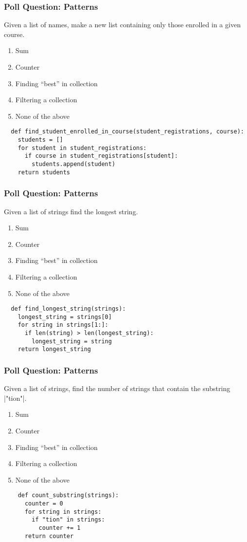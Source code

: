 \documentclass{beamer}
\begin{document}
%
%
\begin{frame}[fragile]
  \frametitle{Poll Question: Patterns}
  Given a list of names, make a new list containing only those enrolled in a given course.
  \begin{enumerate}[A]
    \item Sum
    \item Counter
    \item Finding ``best'' in collection
    \item Filtering a collection
    \item None of the above
  \end{enumerate}
  \vfill
  \begin{lstlisting}
  def find_student_enrolled_in_course(student_registrations, course):
    students = []
    for student in student_registrations:
      if course in student_registrations[student]:
        students.append(student)
    return students
  \end{lstlisting}
\end{frame}

%
%
\begin{frame}[fragile]
  \frametitle{Poll Question: Patterns}
  Given a list of strings find the longest string.
  \begin{enumerate}[A]
    \item Sum
    \item Counter
    \item Finding ``best'' in collection
    \item Filtering a collection
    \item None of the above
  \end{enumerate}
  \vfill
  \begin{lstlisting}
  def find_longest_string(strings):
    longest_string = strings[0]
    for string in strings[1:]:
      if len(string) > len(longest_string):
        longest_string = string
    return longest_string
  \end{lstlisting}
\end{frame}

%
%
\begin{frame}[fragile]
  \frametitle{Poll Question: Patterns}
  Given a list of strings, find the number of strings that contain the substring \lstlinline|"tion"|.
  \begin{enumerate}[A]
    \item Sum
    \item Counter
    \item Finding ``best'' in collection
    \item Filtering a collection
    \item None of the above
  \end{enumerate}
  \vfill
  \begin{lstlisting}
    def count_substring(strings):
      counter = 0
      for string in strings:
        if "tion" in strings:
          counter += 1
      return counter
  \end{lstlisting}
\end{frame}
\end{document}
